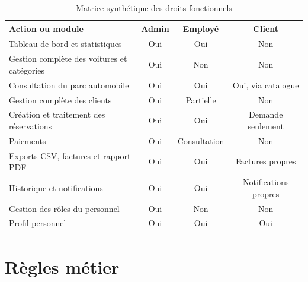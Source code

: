 \begin{table}[H]
\centering
\caption{Matrice synthétique des droits fonctionnels}
\begin{tabularx}{\textwidth}{|X|c|c|c|}
\hline
\textbf{Action ou module} & \textbf{Admin} & \textbf{Employé} & \textbf{Client} \\
\hline
Tableau de bord et statistiques & Oui & Oui & Non \\
\hline
Gestion complète des voitures et catégories & Oui & Non & Non \\
\hline
Consultation du parc automobile & Oui & Oui & Oui, via catalogue \\
\hline
Gestion complète des clients & Oui & Partielle & Non \\
\hline
Création et traitement des réservations & Oui & Oui & Demande seulement \\
\hline
Paiements & Oui & Consultation & Non \\
\hline
Exports CSV, factures et rapport PDF & Oui & Oui & Factures propres \\
\hline
Historique et notifications & Oui & Oui & Notifications propres \\
\hline
Gestion des rôles du personnel & Oui & Non & Non \\
\hline
Profil personnel & Oui & Oui & Oui \\
\hline
\end{tabularx}
\end{table}

\section{Règles métier}

